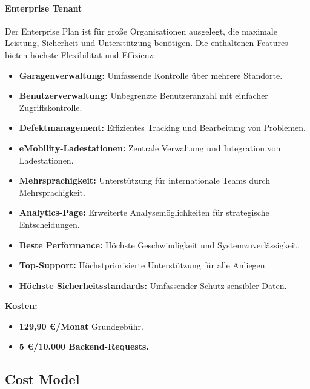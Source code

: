 \paragraph{Enterprise Tenant}
Der Enterprise Plan ist für große Organisationen ausgelegt, die maximale Leistung, Sicherheit und Unterstützung benötigen. Die enthaltenen Features bieten höchste Flexibilität und Effizienz:
\begin{itemize}
    \item \textbf{Garagenverwaltung:} Umfassende Kontrolle über mehrere Standorte.
    \item \textbf{Benutzerverwaltung:} Unbegrenzte Benutzeranzahl mit einfacher Zugriffskontrolle.
    \item \textbf{Defektmanagement:} Effizientes Tracking und Bearbeitung von Problemen.
    \item \textbf{eMobility-Ladestationen:} Zentrale Verwaltung und Integration von Ladestationen.
    \item \textbf{Mehrsprachigkeit:} Unterstützung für internationale Teams durch Mehrsprachigkeit.
    \item \textbf{Analytics-Page:} Erweiterte Analysemöglichkeiten für strategische Entscheidungen.
    \item \textbf{Beste Performance:} Höchste Geschwindigkeit und Systemzuverlässigkeit.
    \item \textbf{Top-Support:} Höchstpriorisierte Unterstützung für alle Anliegen.
    \item \textbf{Höchste Sicherheitsstandards:} Umfassender Schutz sensibler Daten.
\end{itemize}
\textbf{Kosten:}
\begin{itemize}
    \item \textbf{129,90 €/Monat} Grundgebühr.
    \item \textbf{5 €/10.000 Backend-Requests.}
\end{itemize}
\subsection{Cost Model}